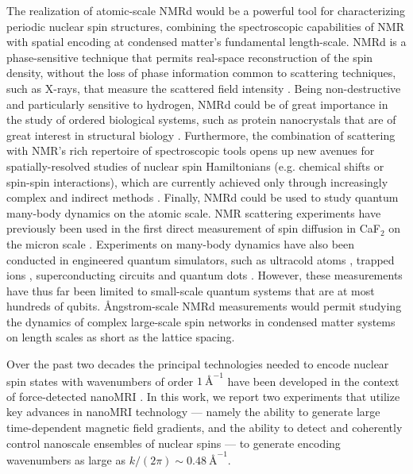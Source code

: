 \documentclass[9pt,twocolumn,twoside,lineno]{pnas-new}
\begin{document}
The realization of atomic-scale NMRd would be a powerful tool for characterizing periodic nuclear spin structures, combining the spectroscopic capabilities of NMR with spatial encoding at condensed matter's fundamental length-scale. NMRd is a phase-sensitive technique that permits real-space reconstruction of the spin density, without the loss of phase information common to scattering techniques, such as X-rays, that measure the scattered field intensity \cite{Hauptman1991}. Being non-destructive and particularly sensitive to hydrogen, NMRd could be of great importance in the study of ordered biological systems, such as protein nanocrystals that are of great interest in structural biology \cite{Chapman2011,Clabbers2018}.
Furthermore, the combination of scattering with NMR's rich repertoire of spectroscopic tools opens up new avenues for spatially-resolved studies of nuclear spin Hamiltonians (e.g. chemical shifts or spin-spin interactions), which are currently achieved only through increasingly complex and indirect methods \cite{Klein2022}. Finally, NMRd could be used to study quantum many-body dynamics on the atomic scale. NMR scattering experiments have previously been used in the first direct measurement of spin diffusion in CaF$_2$ on the micron scale \cite{Zhang1998}.
Experiments on many-body dynamics have also been conducted in engineered quantum simulators, such as ultracold atoms \cite{Bloch2008,Jepsen2020,Wei2022}, trapped ions \cite{Monroe2021,Mei2022,Kaplan2020}, superconducting circuits \cite{Xu2018,Zhu2022,Guo2021} and quantum dots \cite{Diepen2021}.
However, these measurements have thus far been limited to small-scale quantum systems that are at most hundreds of qubits.
{\AA}ngstrom-scale NMRd measurements would permit studying the dynamics of complex large-scale spin networks in condensed matter systems on length scales as short as the lattice spacing.

Over the past two decades the principal technologies needed to encode nuclear spin states with wavenumbers of order $1\ \text{\AA}^{-1}$ have been developed in the context of force-detected nanoMRI \cite{Degen2009,Nichol2012,Nichol2013,Arai2015,Rose2018,Barbic2002,Barbic2002_2}.
In this work, we report two experiments that utilize key advances in nanoMRI technology — namely the ability to generate large time-dependent magnetic field gradients, and the ability to detect and coherently control nanoscale ensembles of nuclear spins \cite{Autler1955, Haeberlen1968, Garwood1996, Garwood2001, Haas2019} — to generate encoding wavenumbers as large as  $k/(2\pi) \sim0.48~\text{\AA}^{-1}$.
\end{document}
